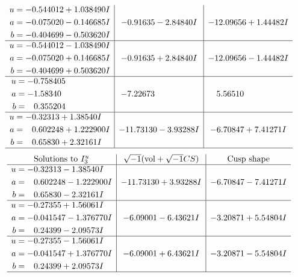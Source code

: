 \documentclass[1p]{elsarticle_modified}
\theoremstyle{definition}
\newcommand{\I}{\sqrt{-1}}
\begin{document}
$$\begin{array}{c|c|c}
\begin{aligned}
u &= -0.544012 + 1.038490 I \\
a &= -0.075020 - 0.146685 I \\
b &= -0.404699 - 0.503620 I\end{aligned}
 & -0.91635 - 2.84840 I & -12.09656 + 1.44482 I \\ \hline\begin{aligned}
u &= -0.544012 - 1.038490 I \\
a &= -0.075020 + 0.146685 I \\
b &= -0.404699 + 0.503620 I\end{aligned}
 & -0.91635 + 2.84840 I & -12.09656 - 1.44482 I \\ \hline\begin{aligned}
u &= -0.758405\phantom{ +0.000000I} \\
a &= -1.58340\phantom{ +0.000000I} \\
b &= \phantom{-}0.355204\phantom{ +0.000000I}\end{aligned}
 & -7.22673\phantom{ +0.000000I} & \phantom{-}5.56510\phantom{ +0.000000I} \\ \hline\begin{aligned}
u &= -0.32313 + 1.38540 I \\
a &= \phantom{-}0.602248 + 1.222900 I \\
b &= \phantom{-}0.65830 + 2.32161 I\end{aligned}
 & -11.73130 - 3.93288 I & -6.70847 + 7.41271 I\\
 \hline 
 \end{array}$$\newpage$$\begin{array}{c|c|c}  
\text{Solutions to }I^u_{3}& \I (\text{vol} + \sqrt{-1}CS) & \text{Cusp shape}\\
 \hline 
\begin{aligned}
u &= -0.32313 - 1.38540 I \\
a &= \phantom{-}0.602248 - 1.222900 I \\
b &= \phantom{-}0.65830 - 2.32161 I\end{aligned}
 & -11.73130 + 3.93288 I & -6.70847 - 7.41271 I \\ \hline\begin{aligned}
u &= -0.27355 + 1.56061 I \\
a &= -0.041547 - 1.376770 I \\
b &= \phantom{-}0.24399 - 2.09573 I\end{aligned}
 & -6.09001 - 6.43621 I & -3.20871 + 5.54804 I \\ \hline\begin{aligned}
u &= -0.27355 - 1.56061 I \\
a &= -0.041547 + 1.376770 I \\
b &= \phantom{-}0.24399 + 2.09573 I\end{aligned}
 & -6.09001 + 6.43621 I & -3.20871 - 5.54804 I\\
 \hline 
 \end{array}$$\newpage\newpage\renewcommand{\arraystretch}{1}
\end{document}
